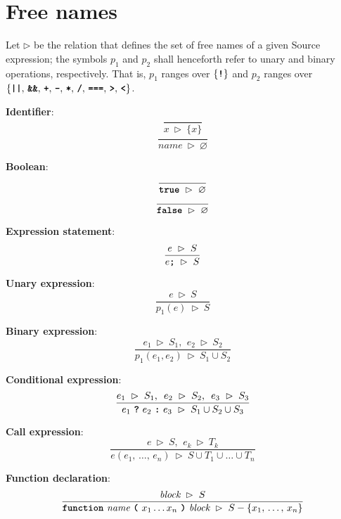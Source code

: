 \pagebreak
\section*{Free names}

Let $\rhd$ be the relation that defines the set of free names of a given Source expression; the symbols $p_1$ and $p_2$ shall henceforth refer to unary and binary operations, respectively. That is, $p_1$ ranges over $\{\textbf{\texttt{!}}\}$ and $p_2$ ranges over $\{\textbf{\texttt{||}},\, \textbf{\texttt{\&\&}},\, \textbf{\texttt{+}},\, \textbf{\texttt{-}},\, \textbf{\texttt{*}},\, \textbf{\texttt{/}},\, \textbf{\texttt{===}},\, \textbf{\texttt{>}},\, \textbf{\texttt{<}}\}$.

\vspace{10mm}
\textbf{Identifier}:
\[
\frac{
}{  
  x
  \ \rhd \
  \{x\}
}
\]
\[
\frac{
}{  
  \textit{name}
  \ \rhd \
  \varnothing
}
\]

\vspace{10mm}
\textbf{Boolean}:
\[
\frac{
}{  
  \textbf{\texttt{true}}
  \ \rhd \
  \varnothing
}
\]
\[
\frac{
}{  
  \textbf{\texttt{false}}
  \ \rhd \
  \varnothing
}
\]

\vspace{10mm}
\textbf{Expression statement}:
\[
\frac{
  e \ \rhd \ S
}{  
  e \textbf{\texttt{;}} \ \rhd \ S
}
\]

\vspace{10mm}
\textbf{Unary expression}:
\[
\frac{
  e \ \rhd \ S
}{  
  p_1(e) \ \rhd \ S
}
\]

\vspace{10mm}
\textbf{Binary expression}:
\[
\frac{
  e_1 \ \rhd \ S_1
  \text{, } \
  e_2 \ \rhd \ S_2
}{  
  p_1(e_1, e_2)
  \ \rhd \
  S_1 \cup S_2
}
\]

\vspace{10mm}
\textbf{Conditional expression}:
\[
\frac{
  e_1 \ \rhd \ S_1
  \text{, } \
  e_2 \ \rhd \ S_2
  \text{, } \
  e_3 \ \rhd \ S_3
}{  
  e_1\  \textbf{\texttt{?}}\ e_2\ \textbf{\texttt{:}}\ e_3
  \ \rhd \
  S_1 \cup S_2 \cup S_3
}
\]

\vspace{10mm}
\textbf{Call expression}:
\[
\frac{
  e \ \rhd \ S
  \text{, } \
  e_k \ \rhd \ T_k
}{  
  e(e_1,\, \ldots,\, e_n)
  \ \rhd \
  S \cup T_1 \cup \ldots \cup T_n
}
\]

\vspace{10mm}
\textbf{Function declaration}:
\[
\frac{
  \textit{block} \ \rhd \ S
}{  
  \textbf{\texttt{function}}\  \textit{name} \ \textbf{\texttt{(}}\ x_1 \ldots x_n \ \textbf{\texttt{)}}\ \textit{block}
  \ \rhd \
  S - \{x_1,\, \ldots,\, x_n\}
}
\]

